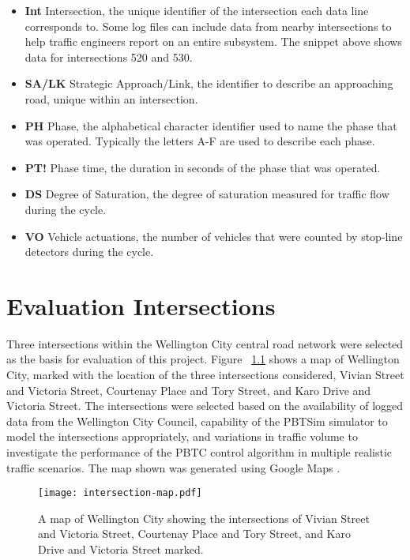 \begin{appendices}
\begin{itemize}
\item \textbf{Int} Intersection, the unique identifier of the intersection each data line corresponds to. Some log files can include data from nearby intersections to help traffic engineers report on an entire subsystem. The snippet above shows data for intersections 520 and 530.
\item \textbf{SA/LK} Strategic Approach/Link, the identifier to describe an approaching road, unique within an intersection.
\item \textbf{PH} Phase, the alphabetical character identifier used to name the phase that was operated. Typically the letters A-F are used to describe each phase. 
\item \textbf{PT!} Phase time, the duration in seconds of the phase that was operated.
\item \textbf{DS} Degree of Saturation, the degree of saturation measured for traffic flow during the cycle.
\item \textbf{VO} Vehicle actuations, the number of vehicles that were counted by stop-line detectors during the cycle.
\end{itemize}

\chapter{Evaluation Intersections}
\label{appendix:scats_intersections}

Three intersections within the Wellington City central road network were selected as the basis for evaluation of this project. Figure ~\ref{intersectionmap} shows a map of Wellington City, marked with the location of the three intersections considered, Vivian Street and Victoria Street, Courtenay Place and Tory Street, and Karo Drive and Victoria Street. The intersections were selected based on the availability of logged data from the Wellington City Council, capability of the PBTSim simulator to model the intersections appropriately, and variations in traffic volume to investigate the performance of the PBTC control algorithm in multiple realistic traffic scenarios. The map shown was generated using Google Maps \cite{googlemaps}.

\begin{figure}[]
\centering
	\texttt{[image: intersection-map.pdf]}
	\caption[A map of Wellington City showing intersections used for evaluation]{ A map of Wellington City showing the intersections of Vivian Street and Victoria Street, Courtenay Place and Tory Street, and Karo Drive and Victoria Street marked. }
\label{intersectionmap}
\end{figure}



\end{appendices}
